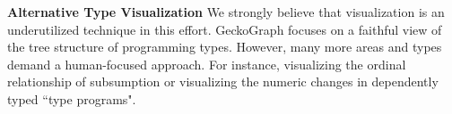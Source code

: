 \noindent\textbf{Alternative Type Visualization}
We strongly believe that visualization is an underutilized technique in this effort. GeckoGraph focuses on a faithful view of the tree structure of programming types. However, many more areas and types demand a human-focused approach. For instance, visualizing the ordinal relationship of subsumption or visualizing the numeric changes in dependently typed ``type programs". 
